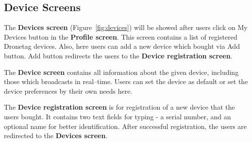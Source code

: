 \subsection{Device Screens}\label{subsec:device-screens}
The \textbf{Devices screen} (Figure~\ref{fig:devices}) will be showed after users click on My Devices button in the \textbf{Profile screen}.
This screen contains a list of registered Dronetag devices.
Also, here users can add a new device which bought via Add button.
Add button redirects the users to the \textbf{Device registration screen}.

The \textbf{Device screen} contains all information about the given device, including those which broadcasts in real--time.
Users can set the device as default or set the device preferences by their own needs here.

The \textbf{Device registration screen} is for registration of a new device that the users bought.
It contains two text fields for typing - a serial number, and an optional name for better identification.
After successful registration, the users are redirected to the \textbf{Devices screen}.
